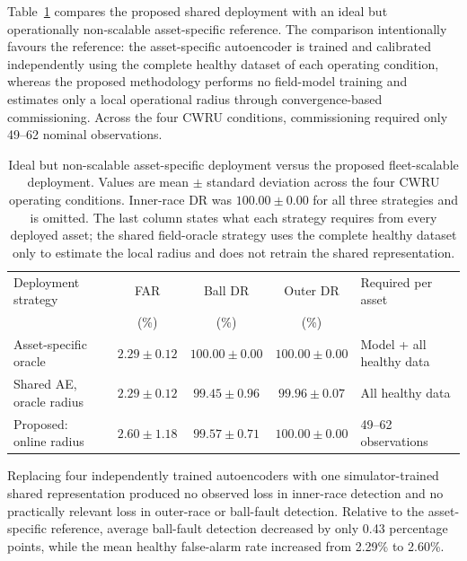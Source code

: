 \documentclass{trbunofficial}
\begin{document}
Table~\ref{tab:oracle-vs-proposed} compares the proposed shared deployment
with an ideal but operationally non-scalable asset-specific reference. The
comparison intentionally favours the reference: the asset-specific
autoencoder is trained and calibrated independently using the complete
healthy dataset of each operating condition, whereas the proposed
methodology performs no field-model training and estimates only a local
operational radius through convergence-based commissioning. Across the four
CWRU conditions, commissioning required only 49--62 nominal observations.

\begin{table}[!ht]
\centering
\caption{Ideal but non-scalable asset-specific deployment versus the proposed
fleet-scalable deployment. Values are mean $\pm$ standard deviation across
the four CWRU operating conditions. Inner-race DR was $100.00 \pm 0.00$ for
all three strategies and is omitted. The last column states what each strategy
requires from every deployed asset; the shared field-oracle strategy uses the
complete healthy dataset only to estimate the local radius and does not
retrain the shared representation.}
\label{tab:oracle-vs-proposed}
\setlength{\tabcolsep}{4pt}
\begin{tabular}{@{}lcccl@{}}
\toprule
Deployment strategy & FAR & Ball DR & Outer DR & Required per asset \\
                    & (\%) & (\%)   & (\%)     &                    \\
\midrule

Asset-specific oracle
& $2.29 \pm 0.12$ & $100.00 \pm 0.00$ & $100.00 \pm 0.00$
& Model + all healthy data \\

Shared AE, oracle radius
& $2.29 \pm 0.12$ & $99.45 \pm 0.96$ & $99.96 \pm 0.07$
& All healthy data \\

Proposed: online radius
& $2.60 \pm 1.18$ & $99.57 \pm 0.71$ & $100.00 \pm 0.00$
& 49--62 observations \\

\bottomrule
\end{tabular}
\end{table}

Replacing four independently trained autoencoders with one
simulator-trained shared representation produced no observed loss in
inner-race detection and no practically relevant loss in outer-race or
ball-fault detection. Relative to the asset-specific reference, average
ball-fault detection decreased by only 0.43 percentage points, while the
mean healthy false-alarm rate increased from 2.29\% to 2.60\%.
\end{document}
